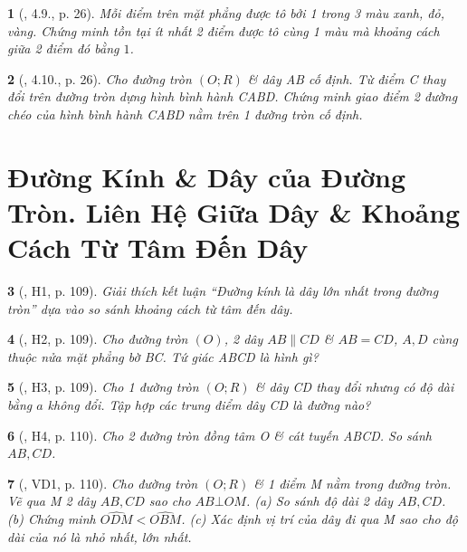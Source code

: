 \documentclass{article}
\newtheorem{baitoan}{}
\begin{document}
\begin{baitoan}[\cite{TLCT_THCS_Toan_9_hinh_hoc}, 4.9., p. 26]
	Mỗi điểm trên mặt phẳng được tô bởi 1 trong 3 màu xanh, đỏ, vàng. Chứng minh tồn tại ít nhất 2 điểm được tô cùng 1 màu mà khoảng cách giữa 2 điểm đó bằng $1$.
\end{baitoan}

\begin{baitoan}[\cite{TLCT_THCS_Toan_9_hinh_hoc}, 4.10., p. 26]
	Cho đường tròn $(O;R)$ \& dây AB cố định. Từ điểm C thay đổi trên đường tròn dựng hình bình hành CABD. Chứng minh giao điểm 2 đường chéo của hình bình hành CABD nằm trên 1 đường tròn cố định.
\end{baitoan}


\section{Đường Kính \& Dây của Đường Tròn. Liên Hệ Giữa Dây \& Khoảng Cách Từ Tâm Đến Dây}

\begin{baitoan}[\cite{Binh_boi_duong_Toan_9_tap_1}, H1, p. 109]
	Giải thích kết luận ``Đường kính là dây lớn nhất trong đường tròn'' dựa vào so sánh khoảng cách từ tâm đến dây.
\end{baitoan}

\begin{baitoan}[\cite{Binh_boi_duong_Toan_9_tap_1}, H2, p. 109]
	Cho đường tròn $(O)$, 2 dây $AB\parallel CD$ \& $AB = CD$, $A,D$ cùng thuộc nửa mặt phẳng bờ BC. Tứ giác ABCD là hình gì?
\end{baitoan}

\begin{baitoan}[\cite{Binh_boi_duong_Toan_9_tap_1}, H3, p. 109]
	Cho 1 đường tròn $(O;R)$ \& dây CD thay đổi nhưng có độ dài bằng $a$ không đổi. Tập hợp các trung điểm dây CD là đường nào?
\end{baitoan}

\begin{baitoan}[\cite{Binh_boi_duong_Toan_9_tap_1}, H4, p. 110]
	Cho 2 đường tròn đồng tâm O \& cát tuyến ABCD. So sánh $AB,CD$.
\end{baitoan}

\begin{baitoan}[\cite{Binh_boi_duong_Toan_9_tap_1}, VD1, p. 110]
	Cho đường tròn $(O;R)$ \& 1 điểm M nằm trong đường tròn. Vẽ qua M 2 dây $AB,CD$ sao cho $AB\bot OM$. (a) So sánh độ dài 2 dây $AB,CD$. (b) Chứng minh $\widehat{ODM} < \widehat{OBM}$. (c) Xác định vị trí của dây đi qua M sao cho độ dài của nó là nhỏ nhất, lớn nhất.
\end{baitoan}
\end{document}
